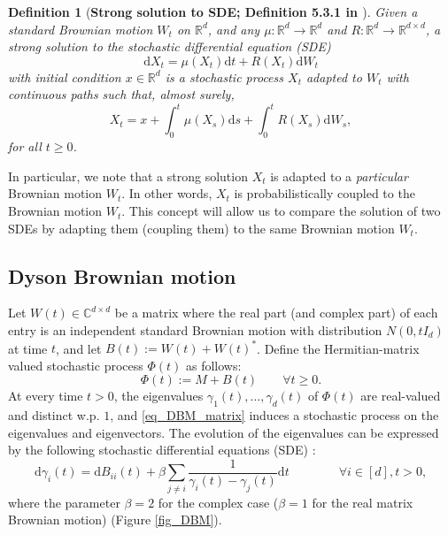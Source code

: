 \documentclass[11pt,letterpaper]{article}
\newtheorem{definition}{Definition}[section]
\begin{document}
\begin{definition}[\bf Strong solution to SDE; Definition 5.3.1 in \cite{karatzas1991brownian}]
Given a standard Brownian motion $W_t$ on $\mathbb{R}^d$, and any $\mu: \mathbb{R}^d \rightarrow \mathbb{R}^d$ and $R: \mathbb{R}^d \rightarrow \mathbb{R}^{d \times d}$, a strong solution to the stochastic differential equation (SDE) $$\mathrm{d} X_t = \mu(X_t) \mathrm{d}t +R(X_t) \mathrm{d}W_t$$ with initial condition $x \in \mathbb{R}^d$ is a stochastic process $X_t$ adapted to $W_t$ with continuous paths such that, almost surely,
%
\begin{equation}
X_t = x + \int_0^t \mu(X_s) \mathrm{d} s + \int_0^t R(X_s) \mathrm{d} W_s,
\end{equation}
for all $t \geq 0$.
\end{definition}
%
\noindent
In particular, we note that a strong solution $X_t$ is adapted to a {\em particular} Brownian motion $W_t$.
%
 In other words, $X_t$ is probabilistically coupled to the Brownian motion $W_t$.
%
This concept will allow us to compare the solution of two SDEs by adapting them (coupling them) to the same Brownian motion $W_t$.

\color{black}

\subsection{Dyson Brownian motion}\label{sec_DBM}

 Let $W(t) \in  \mathbb{C}^{d \times d}$ be a matrix where the real part (and complex part) of each entry is an independent standard Brownian motion with distribution $N(0, tI_d)$ at time $t$, and let $B(t) := W(t) + W(t)^\ast$.
%
Define the Hermitian-matrix valued stochastic process $\Phi(t)$ as follows:
\begin{equation} \label{eq_DBM_matrix}
    \Phi(t):= M + B(t) \qquad  \forall t\geq 0.
\end{equation}
%
%
At every time $t>0$, the eigenvalues $\gamma_1(t), \ldots, \gamma_d(t)$ of $\Phi(t)$ are real-valued and  distinct w.p. $1$, and \eqref{eq_DBM_matrix} induces a stochastic process on the eigenvalues and eigenvectors.
%
The  evolution of the eigenvalues can be expressed by the following stochastic differential equations  (SDE) \cite{dyson1962brownian}: 
%
\begin{equation} \label{eq_DBM_eigenvalues}
   \mathrm{d} \gamma_i(t) = \mathrm{d}B_{i i}(t) +  \beta \sum_{j \neq i} \frac{1}{\gamma_i(t) - \gamma_j(t)} \mathrm{d}t \qquad \qquad \forall i \in [d], t > 0,
\end{equation}
%
where the parameter $\beta=2$ for the complex case ($\beta=1$ for the real matrix Brownian motion) (Figure \ref{fig_DBM}).
% 
\end{document}
